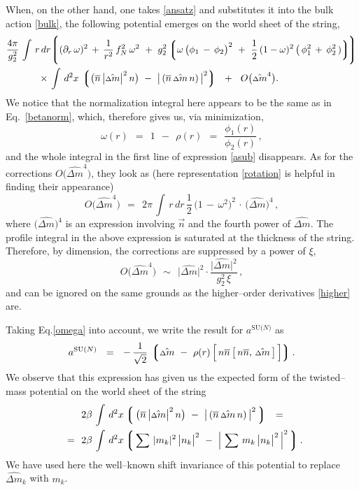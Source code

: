 \documentclass[12pt]{article}
\def\beq{\begin{equation}}
\def\eeq{\end{equation}}
\newcommand{\p}{\partial}
\newcommand{\ov}{\overline}
\newcommand{\lgr}{\left\lgroup}
\newcommand{\rgr}{\right\rgroup}
\newcommand{\aN}{a^\text{SU($N$)}}
\newcommand{\nbar}{\ov{n}}
\newcommand{\nnbar}{n\ov{n}}
\newcommand{\dm}{\hat{{\scriptstyle \Delta} m}}
\begin{document}
	When, on the other hand, one takes \eqref{ansatz} and substitutes it into the bulk action \eqref{bulk},
	the following potential emerges on the world sheet of the string,
\begin{align}
%
\notag
	&
	\frac{4\pi}{g_2^2}\, \int\, r\, dr
		\Biggl\lgroup  (\p_r\, \omega)^2 \,+\, \frac{1}{r^2}\, f_N^2\, \omega^2 
			~+~  g_2^2 \lgr \omega\, \big( \phi_1 \,-\, \phi_2 \big)^2  ~+~
				\frac{1}{2}\, (1 - \omega)^2\, \big(\, \phi_1^2 \,+\, \phi_2^2 \,) \rgr
		\!\Biggr\rgroup
	\\
%
\label{asub}
	&
	\qquad\quad~
	\times\,
	\int\, d^2x\,
	\lgr  \big( \nbar\, \big| \dm \big|^2\, n \big)  ~-~  \big|\, ( \nbar\, \dm\, n ) \,\big|^2  \rgr
	~~+~~
	O \big( \dm^4 \big).
\end{align}
	We notice that the normalization integral here appears to be the same as in Eq.~\eqref{betanorm},
	which, therefore gives us, via minimization, 
\beq
\label{omega}
	\omega(r)    ~~=~~    1  ~~-~~ \rho(r)    ~~=~~    \frac{\phi_1(r)}{\phi_2(r)}\,,
\eeq
	and the whole integral in the first line of expression \eqref{asub} disappears.
	As for the corrections $ O \big( \dm^4 \big) $, they look as (here representation \eqref{rotation} is helpful in finding their appearance)
\beq
	O \big( \dm^4 \big)    ~~=~~    
	2\pi\, \int\, r\, dr\, \frac{1}{2}\, \big( 1 \,-\, \omega^2 \big)^2 \,\cdot\, \big( \dm \big)^4 \,,
\eeq
	where $ \big( \dm \big)^4 $ is an expression involving $ \vec{n} $ and the fourth power of $ \dm $.
	The profile integral in the above expression is saturated at the thickness of the string.
	Therefore, by dimension, the corrections are suppressed by a power of $ \xi $,
\beq
	O \big( \dm^4 \big)    ~~\sim~~    \big| \dm \big|^2 \cdot \frac{ \big| \dm \big|^2 }{ g_2^2\, \xi }\,,
\eeq
	and can be ignored on the same grounds as the higher--order derivatives \eqref{higher} are.

	Taking Eq.\eqref{omega} into account, we write the result for $ \aN $ as
\beq
\label{aN}
	\aN    ~~=~~    
	-\, \frac{1}{\sqrt{2}}\, 
	\lgr \dm  ~-~  \rho(r)\, \Big[\, \nnbar\, \big[\, \nnbar,\, \dm \,\big] \,\Big] \rgr.
\eeq
	We observe that this expression has given us the expected form of the 
	twisted--mass potential on the world sheet of the string
\begin{align}
%
\notag
	& 2\beta\, \int\, d^2x \lgr\,  \big( \nbar\, \big| \dm \big|^2\, n \big)  ~-~  \big|\, ( \nbar\, \dm\, n ) \,\big|^2  \,\rgr
	~~=~~ 
	\\
%
\label{twpot}
	~~=~~ &
	2\beta\, \int\, d^2x \lgr\, \sum\, | m_k |^2\, \big| n_k \big|^2   ~-~  \Big|\, \sum\, m_k\, \big| n_k \big|^2 \,\Big|^2 \,\rgr.
\end{align}
	We have used here the well--known shift invariance of this potential to replace $ \dm{}_k $ with $ m_k $.
\end{document}
